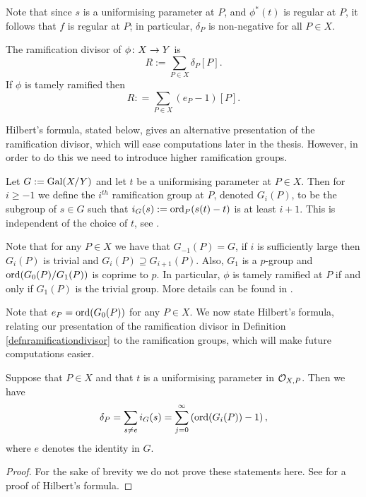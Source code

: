 Note that since $s$ is a uniformising parameter at $P$, and $\phi^*(t)$ is regular at $P$, it follows that $f$ is regular at $P$; in particular, $\delta_P$ is non-negative for all $P \in X$.
 
    \begin{defn}\label{defnramificationdivisor}
    The ramification divisor of $\phi \colon X \rightarrow Y$ is 
        \[
        R:= \sum_{P \in X} \delta_P [P].
        \]
    If $\phi$ is tamely ramified then 
        \[
        R: = \sum_{P \in X} (e_P - 1)[P].
        \]
    \end{defn}

Hilbert's formula, stated below, gives an alternative presentation of the ramification divisor, which will ease computations later in the thesis.
However, in order to do this we need to introduce higher ramification groups.

   \begin{defn}
    Let $G:=\operatorname{Gal}(X/Y)$ and let $t$ be a uniformising parameter at $P\in X$.
    Then for $i\geq -1$ we define the $i^{th}$ ramification group at $P$, denoted $G_i(P)$, to be the subgroup of $s\in G$ such that $i_G(s) := \operatorname{ord}_P(s(t)-t)$ is at least $i+1$.
    This is	independent of the choice of $t$, see \cite[Chap. IV, \S 1, pg. 62]{localfields}.
    \end{defn}

Note that for any $P\in X$ we have that $G_{-1}(P)=G$, if $i$ is sufficiently large then $G_i(P)$ is trivial and $G_i(P)\supseteq G_{i+1}(P)$.
Also, $G_1$ is a $p$-group and $\operatorname{ord}(G_0(P)/G_1(P))$ is coprime to $p$.
In particular, $\phi$ is tamely ramified at $P$ if and only if $G_1(P)$ is the trivial group.
More details can be found in \cite[Chap. IV, \S 1]{localfields}.%

Note that $e_P = \operatorname{ord} (G_0(P))$ for any $P \in X$.
We now state Hilbert's formula, relating our presentation of the ramification divisor in Definition \ref{defnramificationdivisor} to the ramification groups, which will make future computations easier.


    \begin{thm}\label{hilbertsformula}
    Suppose that $P\in X$ and that $t$ is a uniformising parameter in ${\cal O}_{X,P}$.
    Then we have
        \begin{equation}
        \delta_P = \sum_{s\neq e}i_G(s)=\sum_{j=0}^{\infty}\left(\operatorname{ord}(G_i(P))-1\right),\label{ramdiv}
        \end{equation}
    where $e$ denotes the identity in $G$.
    \end{thm}
    \begin{proof}
    For the sake of brevity we do not prove these statements here. See \cite[Chap. IV, \S 1, Prop. 4]{localfields} for a proof of Hilbert's formula.
    \end{proof}


